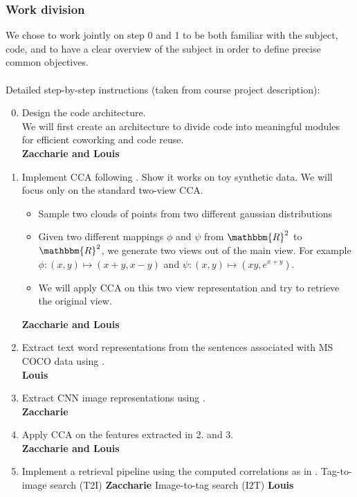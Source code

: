 \documentclass[a4paper,12pt]{article}
\begin{document}
\subsubsection*{Work division}
We chose to work jointly on step 0 and 1 to be both familiar with the subject,
code, and to have a clear overview of the subject in order to define precise
common objectives.\\
\\
Detailed step-by-step instructions (taken from course project description):
\begin{enumerate}
  \setcounter{enumi}{-1}
  \item Design the code architecture.\\
  We will first create an architecture to divide code into meaningful modules for
  efficient coworking and code reuse.
  \\\textbf{Zaccharie and Louis}
  \item Implement CCA following \cite{normalizedcca}. Show it works on toy synthetic data.
  We will focus only on the standard two-view CCA.
    \begin{itemize}
      \item Sample two clouds of points from two different gaussian distributions
      \item Given two different mappings $\phi$ and $\psi$ from $\mathbbm{R}^2$
      to $\mathbbm{R}^2$, we generate two views out of the main view.
      For example $\phi: (x,y) \mapsto (x+y,x-y)$ and $\psi: (x,y) \mapsto (xy,e^{x+y})$.
      \item We will apply CCA on this two view representation and try to
      retrieve the original view.
    \end{itemize}
  \textbf{Zaccharie and Louis}
  \item Extract text word representations from the sentences associated with MS COCO data using \cite{word2vec}.
  \\\textbf{Louis}
  \item Extract CNN image representations using \cite{overfeat}.
  \\\textbf{Zaccharie}
  \item Apply CCA on the features extracted in 2. and 3.
  \\\textbf{Zaccharie and Louis}
  \item Implement a retrieval pipeline using the computed correlations as in \cite{normalizedcca}.
    \subitem Tag-to-image search (T2I)
    \textbf{Zaccharie}
    \subitem Image-to-tag search (I2T)
    \textbf{Louis}

\end{enumerate}
\end{document}
